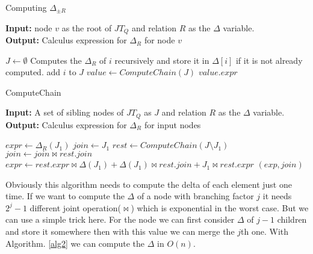 \documentclass[12pt]{article}
\begin{document}
\begin{algorithm}[H]
\caption{Computing $\Delta_{\pm R}$} 
\label{alg1}
\textbf{Input:} node $v$ as the root of $JT_{Q}$ and relation $R$ as the $\Delta$ variable.\\
\textbf{Output:} Calculus expression for $\Delta_{R}$ for node $v$
\begin{algorithmic}[1]
\STATE $J\gets \emptyset$
\STATE Computes the $\Delta_{R}$ of $i$ recursively and store it in $\Delta[i]$ if it is not already computed.
\STATE add $i$ to $J$
\ENDIF
\ENDFOR
\STATE $value\gets ComputeChain(J)$
\RETURN $value.expr$
\end{algorithmic}
\end{algorithm}

\begin{algorithm}[H]
\caption{ComputeChain} 
\label{alg2}
\textbf{Input:} A set of sibling nodes of $JT_{Q}$ as $J$ and relation $R$ as the $\Delta$ variable.\\
\textbf{Output:} Calculus expression for $\Delta_{R}$ for input nodes\\
\begin{algorithmic}[1]
\STATE $expr\gets \Delta_{R}(J_{1})$ 
\STATE $join\gets J_{1}$
\ELSE
\STATE $rest\gets ComputeChain(J\setminus J_{1})$
\STATE $join\gets join\bowtie rest.join$
\STATE $expr\gets rest.expr\bowtie \Delta(J_{1})+\Delta(J_{1})\bowtie rest.join+J_{1}\bowtie rest.expr$
\ENDIF
\RETURN $(exp,join)$
\end{algorithmic}
\end{algorithm}

Obviously this algorithm needs to compute the delta of each element just one time. If we want to compute the $\Delta$ of a node with branching factor $j$ it needs $2^{j}-1$ different joint operation($\bowtie$) which is exponential in the worst case. But we can use a simple trick here. For the node we can first consider $\Delta$ of $j-1$ children and store it somewhere then with this value we can merge the $j$th one. With Algorithm. \ref{alg2} we can compute the $\Delta$ in $O(n)$.
\end{document}
